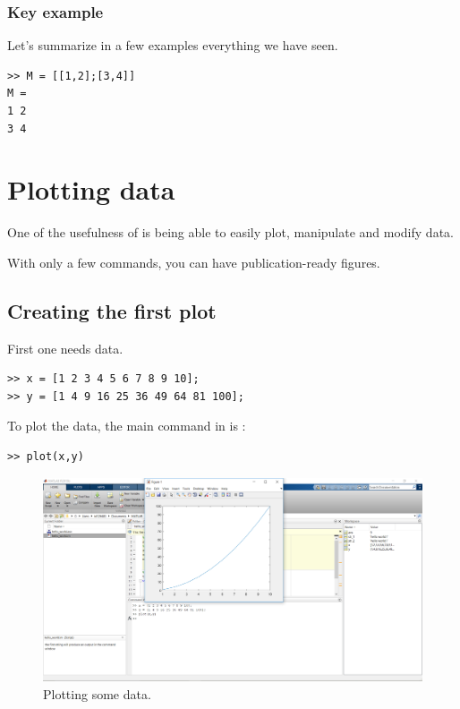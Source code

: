 	\subsection{Key example}
		Let's summarize in a few examples everything we have seen.
\begin{lstlisting}
>> M = [[1,2];[3,4]]
M = 
1 2 
3 4
\end{lstlisting}








\chapter{Plotting data}
One of the usefulness of \matlab is being able to easily plot, manipulate and modify data.

With only a few commands, you can have publication-ready figures.


\section{Creating the first plot}
	First one needs data.
\begin{lstlisting}
>> x = [1 2 3 4 5 6 7 8 9 10];
>> y = [1 4 9 16 25 36 49 64 81 100];
\end{lstlisting}
	To plot the data, the main command in \matlab is :
\begin{lstlisting}
>> plot(x,y)
\end{lstlisting}

	\begin{figure}
		\center
		\includegraphics[width=0.95\linewidth]{./fig/plot_1.PNG}
		\caption{
			Plotting some data.
			}
		\label{fig-workspace}
	\end{figure}	
	
